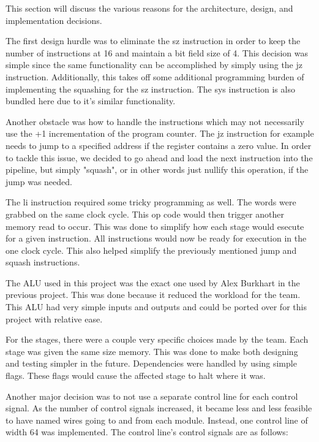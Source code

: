 \documentclass[conference]{IEEEtran}
\begin{document}
This section will discuss the various reasons for the architecture, design, and implementation decisions.

The first design hurdle was to eliminate the sz instruction in order to keep the number of instructions at 16 and maintain a bit field size of 4.  This decision was simple since the same functionality can be accomplished by simply using the jz instruction.  Additionally, this takes off some additional programming burden of implementing the squashing for the sz instruction.  The sys instruction is also bundled here due to it's similar functionality.

Another obstacle was how to handle the instructions which may not necessarily use the +1 incrementation of the program counter.  The jz instruction for example needs to jump to a specified address if the register contains a zero value.  In order to tackle this issue, we decided to go ahead and load the next instruction into the pipeline, but simply "squash", or in other words just nullify this operation, if the jump was needed.

The li instruction required some tricky programming as well. The words were grabbed on the same clock cycle. This op code would then trigger another memory read to occur. This was done to simplify how each stage would esecute for a given instruction. All instructions would now be ready for execution in the one clock cycle. This also helped simplify the previously mentioned jump and squash instructions.

The ALU used in this project was the exact one used by Alex Burkhart in the previous project. This was done because it reduced the workload for the team. This ALU had very simple inputs and outputs and could be ported over for this project with relative ease. 

For the stages, there were a couple very specific choices made by the team. Each stage was given the same size memory. This was done to make both designing and testing simpler in the future. Dependencies were handled by using simple flags. These flags would cause the affected stage to halt where it was. 


Another major decision was to not use a separate control line for each control signal.
As the number of control signals increased, it became less and less feasible to have named wires going to and from each module.
Instead, one control line of width 64 was implemented.
The control line's control signals are as follows:
\end{document}
